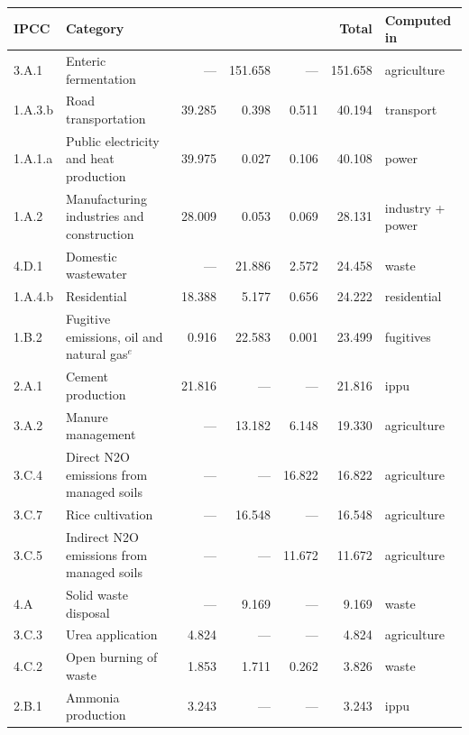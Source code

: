 \begin{tabular}{@{}llrrrrl@{}}
\toprule
\textbf{IPCC} & \textbf{Category} & \textbf{\COtwo{}} & \textbf{\CHfour{}} & \textbf{\NtwoO{}}
& \textbf{Total} & \textbf{Computed in} \\
\midrule
3.A.1 & Enteric fermentation & --- & 151.658 & --- & 151.658 & agriculture \\
1.A.3.b & Road transportation & 39.285 & 0.398 & 0.511 & 40.194 & transport \\
1.A.1.a & Public electricity and heat production & 39.975 & 0.027 & 0.106 & 40.108 & power \\
1.A.2 & Manufacturing industries and construction & 28.009 & 0.053 & 0.069 & 28.131 & industry + power \\
4.D.1 & Domestic wastewater & --- & 21.886 & 2.572 & 24.458 & waste \\
1.A.4.b & Residential & 18.388 & 5.177 & 0.656 & 24.222 & residential \\
1.B.2 & Fugitive emissions, oil and natural gas$^{e}$ & 0.916 & 22.583 & 0.001 & 23.499 & fugitives \\
2.A.1 & Cement production & 21.816 & --- & --- & 21.816 & ippu \\
3.A.2 & Manure management & --- & 13.182 & 6.148 & 19.330 & agriculture \\
3.C.4 & Direct N2O emissions from managed soils & --- & --- & 16.822 & 16.822 & agriculture \\
3.C.7 & Rice cultivation & --- & 16.548 & --- & 16.548 & agriculture \\
3.C.5 & Indirect N2O emissions from managed soils & --- & --- & 11.672 & 11.672 & agriculture \\
4.A & Solid waste disposal & --- & 9.169 & --- & 9.169 & waste \\
3.C.3 & Urea application & 4.824 & --- & --- & 4.824 & agriculture \\
4.C.2 & Open burning of waste & 1.853 & 1.711 & 0.262 & 3.826 & waste \\
2.B.1 & Ammonia production & 3.243 & --- & --- & 3.243 & ippu \\

\end{tabular}

